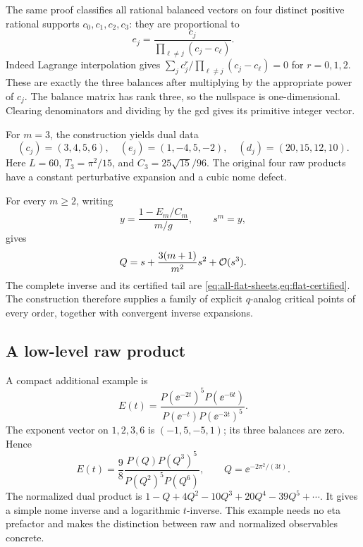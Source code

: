 The same proof classifies all rational balanced vectors on four
distinct positive rational supports \(c_0,c_1,c_2,c_3\):
they are proportional to
\begin{equation}\label{eq:four-support-classification}
 e_j=\frac{c_j}{\prod_{\ell\ne j}(c_j-c_\ell)}.
\end{equation}
Indeed Lagrange interpolation gives
\(\sum_jc_j^r/\prod_{\ell\ne j}(c_j-c_\ell)=0\)
for \(r=0,1,2\).
These are exactly the three balances after multiplying by the
appropriate power of \(c_j\).
The balance matrix has rank three, so the nullspace is
one-dimensional.  Clearing denominators and dividing by the
gcd gives its primitive integer vector.

For \(m=3\), the construction yields dual data
\[
 (c_j)=(3,4,5,6),\quad (e_j)=(1,-4,5,-2),\quad
 (d_j)=(20,15,12,10).
\]
Here \(L=60\), \(T_3=\pi^2/15\), and
\(C_3=25\sqrt{15}/96\).
The original four raw products have a constant perturbative
expansion and a cubic nome defect.

For every \(m\ge2\), writing
\[
 y=\frac{1-E_m/C_m}{m/g},\qquad s^m=y,
\]
gives
\[
 Q=s+\frac{3(m+1)}{m^2}s^2+\mathcal O(s^3).
\]
The complete inverse and its certified tail are
\cref{eq:all-flat-sheets,eq:flat-certified}.
The construction therefore supplies a family of explicit
\(q\)-analog critical points of every order, together with
convergent inverse expansions.

\subsection{A low-level raw product}

A compact additional example is
\[
 E(t)=
 \frac{P(\ee^{-2t})^5P(\ee^{-6t})}
      {P(\ee^{-t})P(\ee^{-3t})^5}.
\]
The exponent vector on \(1,2,3,6\) is \((-1,5,-5,1)\);
its three balances are zero.  Hence
\[
 E(t)=\frac98
 \frac{P(Q)P(Q^3)^5}{P(Q^2)^5P(Q^6)},
 \qquad Q=\ee^{-2\pi^2/(3t)}.
\]
The normalized dual product is
\(1-Q+4Q^2-10Q^3+20Q^4-39Q^5+\cdots\).
It gives a simple nome inverse and a logarithmic \(t\)-inverse.
This example needs no eta prefactor and makes the distinction
between raw and normalized observables concrete.
